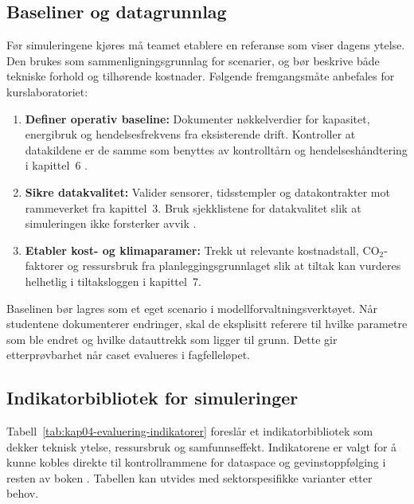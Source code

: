 \subsection{Baseliner og datagrunnlag}
Før simuleringene kjøres må teamet etablere en referanse som viser dagens ytelse. Den brukes som sammenligningsgrunnlag for scenarier, og bør beskrive både tekniske forhold og tilhørende kostnader. Følgende fremgangsmåte anbefales for kurslaboratoriet:
\begin{enumerate}
    \item \textbf{Definer operativ baseline:} Dokumenter nøkkelverdier for kapasitet, energibruk og hendelsesfrekvens fra eksisterende drift. Kontroller at datakildene er de samme som benyttes av kontrolltårn og hendelseshåndtering i kapittel~6 \citep{statnett2024kontrolltarn}.
    \item \textbf{Sikre datakvalitet:} Valider sensorer, tidsstempler og datakontrakter mot rammeverket fra kapittel~3. Bruk sjekklistene for datakvalitet slik at simuleringen ikke forsterker avvik \citep{energinorge2023beredskap}.
    \item \textbf{Etabler kost- og klimaparamer:} Trekk ut relevante kostnadstall, CO$_2$-faktorer og ressursbruk fra planleggingsgrunnlaget slik at tiltak kan vurderes helhetlig i tiltaksloggen i kapittel~7.
\end{enumerate}
Baselinen bør lagres som et eget scenario i modellforvaltningsverktøyet. Når studentene dokumenterer endringer, skal de eksplisitt referere til hvilke parametre som ble endret og hvilke datauttrekk som ligger til grunn. Dette gir etterprøvbarhet når caset evalueres i fagfelleløpet.

\subsection{Indikatorbibliotek for simuleringer}
Tabell~\ref{tab:kap04-evaluering-indikatorer} foreslår et indikatorbibliotek som dekker teknisk ytelse, ressursbruk og samfunnseffekt. Indikatorene er valgt for å kunne kobles direkte til kontrollrammene for dataspace og gevinstoppfølging i resten av boken \citep{digdir2022gevinst,nve2023nettplan}. Tabellen kan utvides med sektorspesifikke varianter etter behov.

